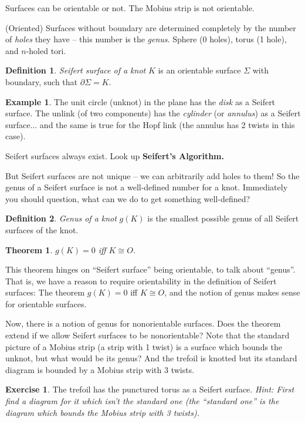 \documentclass[11pt]{article}
\theoremstyle{plain}
\newtheorem{thm}{Theorem}
\theoremstyle{definition}
\newtheorem{definition}{Definition}
\newtheorem{ex}{Example}
\newtheorem{exercise}{Exercise}
\begin{document}
Surfaces can be orientable or not. The Mobius strip is not orientable.

\bigskip
(Oriented) Surfaces without boundary are determined completely by the number of \textit{holes} they have -- this number is the \textit{genus}. Sphere (0 holes), torus (1 hole), and $n$-holed tori.

\begin{definition}
\textit{Seifert surface of a knot} $K$ is an orientable surface $\Sigma$ with boundary, such that $\partial \Sigma=K$.
\end{definition}

\begin{ex}
The unit circle (unknot) in the plane has the \textit{disk} as a Seifert surface. The unlink (of two components) has the \textit{cylinder} (or \textit{annulus}) as a Seifert surface... and the same is true for the Hopf link (the annulus has 2 twists in this case).
\end{ex}

Seifert surfaces always exist. Look up \textbf{Seifert's Algorithm.}

\bigskip
But Seifert surfaces are not unique -- we can arbitrarily add holes to them! So the genus of a Seifert surface is not a well-defined number for a knot. Immediately you should question, what can we do to get something well-defined?

\begin{definition}
\textit{Genus of a knot} $g(K)$ is the smallest possible genus of all Seifert surfaces of the knot.
\end{definition}

\begin{thm}
$g(K)=0$ iff $K\cong O$.
\end{thm}

This theorem hinges on ``Seifert surface'' being orientable, to talk about ``genus''. That is, we have a reason to require orientability in the definition of Seifert surfaces: The theorem $g(K)=0$ iff $K\cong O$, and the notion of genus makes sense for orientable surfaces.

Now, there is a notion of genus for nonorientable surfaces. Does the theorem extend if we allow Seifert surfaces to be nonorientable? Note that the standard picture of a Mobius strip (a strip with 1 twist) is a surface which bounds the unknot, but what would be its genus? And the trefoil is knotted but its standard diagram is bounded by a Mobius strip with 3 twists.

\begin{exercise}
The trefoil has the punctured torus as a Seifert surface. \textit{Hint: First find a diagram for it which isn't the standard one (the ``standard one'' is the diagram which bounds the Mobius strip with 3 twists).}
\end{exercise}
\end{document}
